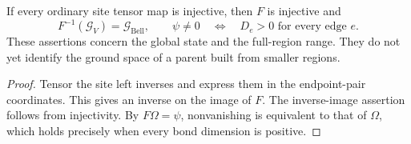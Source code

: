 \begin{lemma}%
    \label{thm:peps_bell_product_injective_image}
    \leanok
    If every ordinary site tensor map is injective, then $F$ is
    injective and
    \[
        F^{-1}(\mathcal G_V)=\mathcal G_{\mathrm{Bell}},\qquad
        \psi\ne0\quad\Longleftrightarrow\quad D_e>0
        \text{ for every edge }e.
    \]
    These assertions concern the global state and the full-region
    range. They do not yet identify the ground space of a parent
    built from smaller regions.
\end{lemma}

\begin{proof}\leanok
    Tensor the site left inverses and express them in the
    endpoint-pair coordinates. This gives an inverse on the image
    of $F$. The inverse-image assertion follows from injectivity.
    By $F\Omega=\psi$, nonvanishing is equivalent to that of
    $\Omega$, which holds precisely when every bond dimension is
    positive.
\end{proof}
